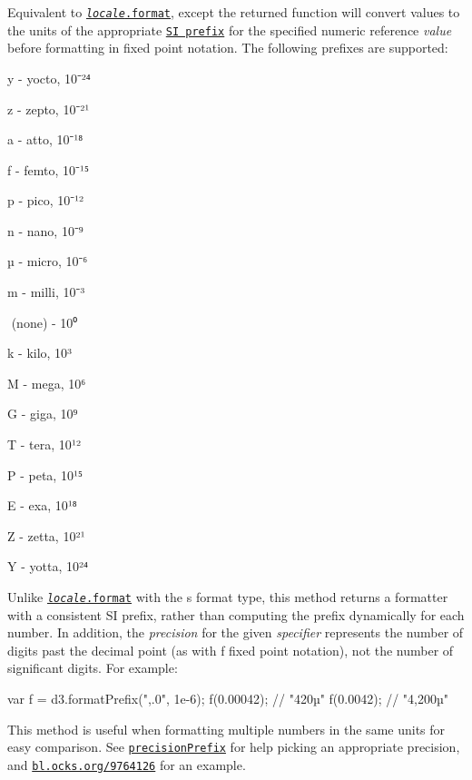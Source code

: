 Equivalent to \href{#locale_format}{\tt {\itshape locale}.format}, except the returned function will convert values to the units of the appropriate \href{https://en.wikipedia.org/wiki/Metric_prefix#List_of_SI_prefixes}{\tt SI prefix} for the specified numeric reference {\itshape value} before formatting in fixed point notation. The following prefixes are supported\+:


\begin{DoxyItemize}
\item {\ttfamily y} -\/ yocto, 10⁻²⁴
\item {\ttfamily z} -\/ zepto, 10⁻²¹
\item {\ttfamily a} -\/ atto, 10⁻¹⁸
\item {\ttfamily f} -\/ femto, 10⁻¹⁵
\item {\ttfamily p} -\/ pico, 10⁻¹²
\item {\ttfamily n} -\/ nano, 10⁻⁹
\item {\ttfamily µ} -\/ micro, 10⁻⁶
\item {\ttfamily m} -\/ milli, 10⁻³
\item {\ttfamily ​} (none) -\/ 10⁰
\item {\ttfamily k} -\/ kilo, 10³
\item {\ttfamily M} -\/ mega, 10⁶
\item {\ttfamily G} -\/ giga, 10⁹
\item {\ttfamily T} -\/ tera, 10¹²
\item {\ttfamily P} -\/ peta, 10¹⁵
\item {\ttfamily E} -\/ exa, 10¹⁸
\item {\ttfamily Z} -\/ zetta, 10²¹
\item {\ttfamily Y} -\/ yotta, 10²⁴
\end{DoxyItemize}

Unlike \href{#locale_format}{\tt {\itshape locale}.format} with the {\ttfamily s} format type, this method returns a formatter with a consistent SI prefix, rather than computing the prefix dynamically for each number. In addition, the {\itshape precision} for the given {\itshape specifier} represents the number of digits past the decimal point (as with {\ttfamily f} fixed point notation), not the number of significant digits. For example\+:


\begin{DoxyCode}
var f = d3.formatPrefix(",.0", 1e-6);
f(0.00042); // "420µ"
f(0.0042); // "4,200µ"
\end{DoxyCode}


This method is useful when formatting multiple numbers in the same units for easy comparison. See \href{#precisionPrefix}{\tt precision\+Prefix} for help picking an appropriate precision, and \href{http://bl.ocks.org/mbostock/9764126}{\tt bl.\+ocks.\+org/9764126} for an example.

